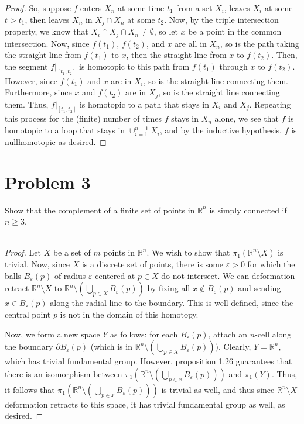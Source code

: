 \documentclass[fontsize=11pt]{scrartcl} %
\numberwithin{equation}{section} %
\numberwithin{figure}{section} %
\numberwithin{table}{section} %
\newcommand{\R}{\mathbb{R}}
\begin{document}
\begin{proof}
    So, suppose $f$ enters $X_n$ at
    some time $t_1$ from a set $X_i$, leaves $X_i$ at some $t>t_1$, then leaves
    $X_n$ in $X_j\cap X_n$ at some $t_2$. Now, by the triple intersection
    property, we know that $X_i\cap X_j\cap X_n \neq \emptyset$, so let $x$ be a
    point in the common intersection. Now, since $f(t_1)$, $f(t_2)$, and $x$ are
    all in $X_n$, so is the path taking the straight line from $f(t_1)$ to $x$,
    then the straight line from $x$ to $f(t_2)$. Then, the segment
    $f|_{[t_1,t_2]}$ is homotopic to this path from $f(t_1)$ through $x$ to
    $f(t_2)$. However, since $f(t_1)$ and $x$ are in $X_i$, so is the straight
    line connecting them. Furthermore, since $x$ and $f(t_2)$ are in $X_j$, so
    is the straight line connecting them. Thus, $f|_{[t_1,t_2]}$ is homotopic to
    a path that stays in $X_i$ and $X_j$. Repeating this process for the
    (finite) number of times $f$ stays in $X_n$ alone, we see that $f$ is
    homotopic to a loop that stays in $\cup_{i=1}^{n-1}X_i$, and by the
    inductive hypothesis, $f$ is nullhomotopic as desired.

\end{proof}

\newpage
\section*{Problem 3}
Show that the complement of a finite set of points in $\R^n$ is simply connected
if $n\geq 3$.
\\
\\
\begin{proof}
    Let $X$ be a set of $m$ points in $\R^n$. We wish to show that
    $\pi_1(\R^n\setminus X)$ is trivial. Now, since $X$ is a discrete set of
    points, there is some $\varepsilon>0$ for which the balls
    $B_{\varepsilon}(p)$ of radius $\varepsilon$ centered at $p\in X$ do not
    intersect. We can deformation retract $\R^n\setminus X$ to $\R^n\setminus
    (\bigcup_{p\in X}B_{\varepsilon}(p))$ by fixing all $x\not\in
    B_{\varepsilon}(p)$ and sending $x\in B_{\varepsilon}(p)$ along the radial
    line to the boundary. This is well-defined, since the central point $p$ is
    not in the domain of this homotopy.

    Now, we form a new space $Y$ as follows: for each $B_{\varepsilon}(p)$,
    attach an $n$-cell along the boundary $\partial B_{\varepsilon}(p)$ (which
    is in $\R^n\setminus(\bigcup_{p\in X}B_{\varepsilon}(p))$). Clearly, $Y =
    \R^n$, which has trivial fundamental group. However, proposition 1.26
    guarantees that there is an isomorphism between $\pi_1(\R^n\setminus
    (\bigcup_{p\in x}B_{\varepsilon}(p)))$ and $\pi_1(Y)$. Thus, it follows that
    $\pi_1(\R^n\setminus(\bigcup_{p\in x}B_{\varepsilon}(p)))$ is trivial as
    well, and thus since $\R^n\setminus X$ deformation retracts to this space,
    it has trivial fundamental group as well, as desired.
\end{proof}
\end{document}
